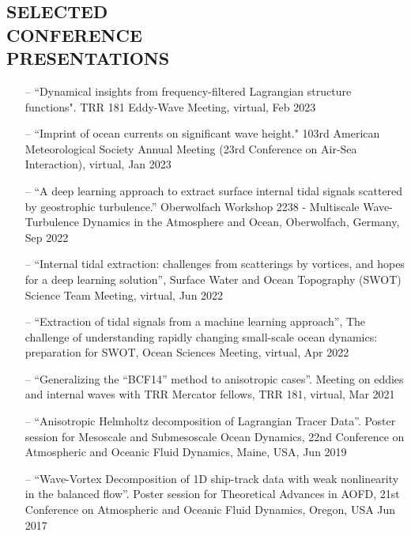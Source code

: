 \documentclass[margin]{res}
\begin{document}
\begin{resume}
\section{{\normalfont SELECTED\\CONFERENCE\\ PRESENTATIONS}}
\begin{itemize}[leftmargin=*,noitemsep]
\item[--]``Dynamical insights from frequency-filtered Lagrangian structure functions". TRR 181 Eddy-Wave Meeting, virtual, Feb 2023
\item[--] ``Imprint of ocean currents on significant wave height." 103rd American Meteorological Society Annual Meeting (23rd Conference on Air-Sea Interaction), virtual, Jan 2023
\item[--] “A deep learning approach to extract surface internal tidal signals scattered by geostrophic turbulence.”  Oberwolfach Workshop 2238 - Multiscale Wave-Turbulence Dynamics in the Atmosphere and Ocean, Oberwolfach, Germany, Sep 2022
\item[--] “Internal tidal extraction: challenges from scatterings by vortices, and hopes for a deep learning solution”, Surface Water and Ocean Topography (SWOT) Science Team Meeting, virtual, Jun 2022
\item[--] “Extraction of tidal signals from a machine learning approach”, The challenge of understanding rapidly changing small-scale ocean dynamics: preparation for SWOT, Ocean Sciences Meeting, virtual, Apr 2022
\item[--] “Generalizing the “BCF14” method to anisotropic cases”. Meeting on eddies and internal waves with TRR Mercator fellows, TRR 181, virtual, Mar 2021
\item[--] “Anisotropic Helmholtz decomposition of Lagrangian Tracer Data”. Poster session for Mesoscale and Submesoscale Ocean Dynamics, 22nd Conference on Atmospheric and Oceanic Fluid Dynamics, Maine, USA, Jun 2019
\item[--] “Wave-Vortex Decomposition of 1D ship-track data with weak nonlinearity in the balanced flow”. Poster session for Theoretical Advances in AOFD, 21st Conference on Atmospheric and Oceanic Fluid Dynamics, Oregon, USA Jun 2017
\end{itemize}

\end{resume}
\end{document}
